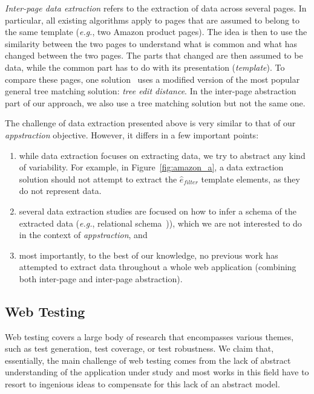 \emph{Inter-page data extraction} refers to the extraction of data across several pages.
In particular, all existing algorithms apply to pages that are assumed to belong to the same template (\emph{e.g.}, two Amazon product pages).
The idea is then to use the similarity between the two pages to understand what is common and what has changed between the two pages.
The parts that changed are then assumed to be data, while the common part has to do with its presentation (\emph{template}).
To compare these pages, one solution~\cite{DeReis2004AutomaticDistance} uses a modified version of the most popular general tree matching solution: \emph{tree edit distance}.
In the inter-page abstraction part of our approach, we also use a tree matching solution but not the same one.

The challenge of data extraction presented above is very similar to that of our \emph{appstraction} objective. However, it differs in a few important points:
\begin{enumerate}
    \item while data extraction focuses on extracting data, we try to abstract any kind of variability.
    For example, in Figure~\ref{fig:amazon_a}, a data extraction solution should not attempt to extract the $\hat{e}_{filter}$ template elements, as they do not represent data.
    \item several data extraction studies are focused on how to infer a schema of the extracted data (\emph{e.g.}, relational schema~\cite{ArasuExtractingPages,NestorovExtractingData})), which we are not interested to do in the context of \emph{appstraction}, and
    \item most importantly, to the best of our knowledge, no previous work has attempted to extract data throughout a whole web application (combining both inter-page and inter-page abstraction).
\end{enumerate}

\subsection{Web Testing}
Web testing covers a large body of research that encompasses various themes, such as test generation, test coverage, or test robustness.
We claim that, essentially, the main challenge of web testing comes from the lack of abstract understanding of the application under study and most works in this field have to resort to ingenious ideas to compensate for this lack of an abstract model.

